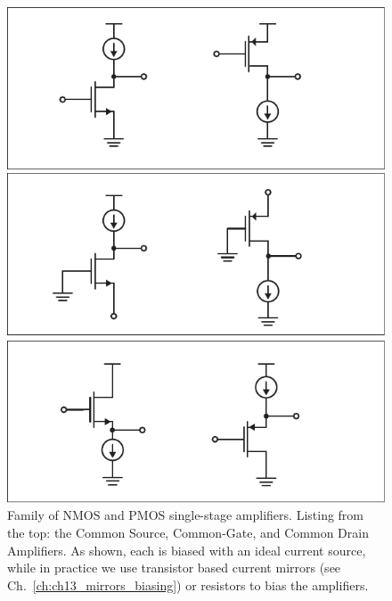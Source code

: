 \begin{figure}[t]
\centering
\includegraphics[scale=1]{ampchart}
\caption{Family of NMOS and PMOS single-stage amplifiers.  Listing from the top: the Common Source, Common-Gate, and Common Drain Amplifiers.  As shown, each is biased with an ideal current source, while in practice we use transistor based current mirrors (see Ch.~\ref{ch:ch13_mirrors_biasing}) or resistors to bias the amplifiers.}
\label{fig:ampchart}
\end{figure}
